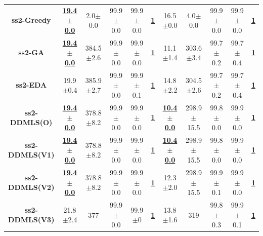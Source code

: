 \documentclass[lettersize,journal]{IEEEtran}
\begin{document}
\begin{table}[!t]
{\begin{tabular}{ccccccccccc}
    \midrule
    {\bfseries ss2-Greedy} &\underline{\bfseries 19.4$\pm$0.0} &2.0$\pm$0.0 & 99.9$\pm$0.0 &99.9$\pm$0.0 &\underline{\bfseries 1} &16.5$\pm$0.0 &4.0$\pm$0.0& 99.9$\pm$0.0 &99.9$\pm$0.0 &\underline{\bfseries 1} \\
    {\bfseries ss2-GA} &\underline{\bfseries 19.4$\pm$0.0} &384.5$\pm$2.6 & 99.9$\pm$0.0 &99.9$\pm$0.0 &\underline{\bfseries 1} &11.1$\pm$1.4 &303.6$\pm$3.4& 99.7$\pm$0.2 &99.7$\pm$0.4 &\underline{\bfseries 1} \\
    {\bfseries ss2-EDA} &19.9$\pm$0.4 &385.9$\pm$2.7 & 99.9$\pm$0.0 &99.9$\pm$0.1 &\underline{\bfseries 1} &14.8$\pm$2.2 &304.5$\pm$2.6& 99.7$\pm$0.2 &99.7$\pm$0.4 &\underline{\bfseries 1} \\
    \bfseries ss2-DDMLS(O) &\underline{\bfseries 19.4$\pm$0.0} &378.8$\pm$8.2 & 99.9$\pm$0.0 &99.9$\pm$0.0 &\underline{\bfseries 1} &\underline{\bfseries10.4$\pm$0.0} &298.9$\pm$15.5& 99.8$\pm$0.0 &99.9$\pm$0.0 &\underline{\bfseries 1} \\
   \bfseries ss2-DDMLS(V1) &\underline{\bfseries 19.4$\pm$0.0} &378.8$\pm$8.2 & 99.9$\pm$0.0 &99.9$\pm$0.0 &\underline{\bfseries 1} &\underline{\bfseries10.4$\pm$0.0} &298.9$\pm$15.5& 99.8$\pm$0.0 &99.9$\pm$0.0 &\underline{\bfseries 1} \\
    {\bfseries ss2-DDMLS(V2)} &\underline{\bfseries19.4$\pm$0.0} &378.8$\pm$8.2 & 99.9$\pm$0.0 &99.9$\pm$0.0 &\underline{\bfseries 1} &12.3$\pm$2.0 &298.9$\pm$15.5& 99.9$\pm$0.1 &99.9$\pm$0.0 &\underline{\bfseries 1} \\
    {\bfseries ss2-DDMLS(V3)} &21.8$\pm$2.4 &377 & 99.9$\pm$0.0 &99.9$\pm$0 &\underline{\bfseries 1} &13.8$\pm$1.6& 319 &99.8$\pm$0.3 &99.9$\pm$0.1 &\underline{\bfseries 1} \\


\end{tabular}}
\end{table}
\end{document}

